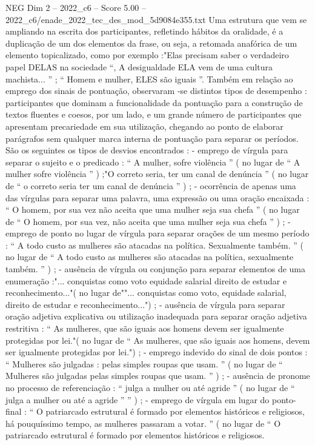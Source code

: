 \begin{textsample}{NEG Dim 2 – 2022\_c6 – Score 5.00 – 2022\_c6/enade\_2022\_tec\_des\_mod\_5d9084e355.txt}
Uma estrutura que vem se ampliando na escrita dos participantes, refletindo hábitos da oralidade, é a duplicação de um dos elementos da frase, ou seja, a retomada anafórica de um elemento topicalizado, como por exemplo :"Elas precisam saber o verdadeiro papel DELAS na sociedade “, A desigualdade ELA vem de uma cultura machista... ” ; “ Homem e mulher, ELES são iguais ”.
Também em relação ao emprego dos sinais de pontuação, observaram -se distintos tipos de desempenho : participantes que dominam a funcionalidade da pontuação para a construção de textos fluentes e coesos, por um lado, e um grande número de participantes que apresentam precariedade em sua utilização, chegando ao ponto de elaborar parágrafos sem qualquer marca interna de pontuação para separar os períodos.
São os seguintes os tipos de desvios encontrados : - emprego de vírgula para separar o sujeito e o predicado : “ A mulher, sofre violência ” ( no lugar de “ A mulher sofre violência ” ) ;"O correto seria, ter um canal de denúncia ” ( no lugar de “ o correto seria ter um canal de denúncia ” ) ; - ocorrência de apenas uma das vírgulas para separar uma palavra, uma expressão ou uma oração encaixada : “ O homem, por sua vez não aceita que uma mulher seja sua chefa ” ( no lugar de “ O homem, por sua vez, não aceita que uma mulher seja sua chefa ” ) ; - emprego de ponto no lugar de vírgula para separar orações de um mesmo período : “ A todo custo as mulheres são atacadas na política.
Sexualmente também. ” ( no lugar de “ A todo custo as mulheres são atacadas na política, sexualmente também. ” ) ; - ausência de vírgula ou conjunção para separar elementos de uma enumeração :"... conquistas como voto equidade salarial direito de estudar e reconhecimento..."( no lugar de""... conquistas como voto, equidade salarial, direito de estudar e reconhecimento...") ; - ausência de vírgula para separar oração adjetiva explicativa ou utilização inadequada para separar oração adjetiva restritiva : “ As mulheres, que são iguais aos homens devem ser igualmente protegidas por lei."( no lugar de “ As mulheres, que são iguais aos homens, devem ser igualmente protegidas por lei.") ; - emprego indevido do sinal de dois pontos : “ Mulheres são julgadas : pelas simples roupas que usam. ” ( no lugar de “ Mulheres são julgadas pelas simples roupas que usam. ” ) ; - ausência de pronome no processo de referenciação : “ julga a mulher ou até agride ” ( no lugar de “ julga a mulher ou até a agride ” ” ) ; - emprego de vírgula em lugar do ponto-final : “ O patriarcado estrutural é formado por elementos históricos e religiosos, há pouquíssimo tempo, as mulheres passaram a votar. ” ( no lugar de “ O patriarcado estrutural é formado por elementos históricos e religiosos.

\end{textsample}
